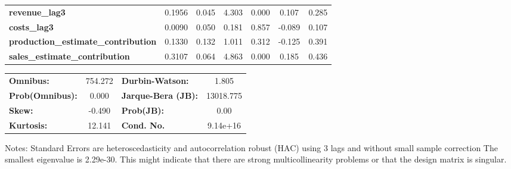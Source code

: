 \begin{center}
\begin{tabular}{lcccccc}
\textbf{revenue\_lag3}                      &       0.1956  &        0.045     &     4.303  &         0.000        &        0.107    &        0.285     \\
\textbf{costs\_lag3}                        &       0.0090  &        0.050     &     0.181  &         0.857        &       -0.089    &        0.107     \\
\textbf{production\_estimate\_contribution} &       0.1330  &        0.132     &     1.011  &         0.312        &       -0.125    &        0.391     \\
\textbf{sales\_estimate\_contribution}      &       0.3107  &        0.064     &     4.863  &         0.000        &        0.185    &        0.436     \\
\bottomrule
\end{tabular}
\begin{tabular}{lclc}
\textbf{Omnibus:}       & 754.272 & \textbf{  Durbin-Watson:     } &     1.805  \\
\textbf{Prob(Omnibus):} &   0.000 & \textbf{  Jarque-Bera (JB):  } & 13018.775  \\
\textbf{Skew:}          &  -0.490 & \textbf{  Prob(JB):          } &      0.00  \\
\textbf{Kurtosis:}      &  12.141 & \textbf{  Cond. No.          } &  9.14e+16  \\
\bottomrule
\end{tabular}
\end{center}

Notes: \newline
 [1] Standard Errors are heteroscedasticity and autocorrelation robust (HAC) using 3 lags and without small sample correction \newline
 [2] The smallest eigenvalue is 2.29e-30. This might indicate that there are \newline
 strong multicollinearity problems or that the design matrix is singular.